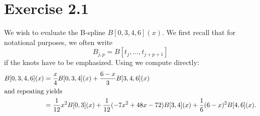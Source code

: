 \documentclass[12pt, article, oneside]{memoir}
\begin{document}
\chapter*{Exercise 2.1}
\label{sec:exercise_2_1}

We wish to evaluate the B-spline \(B[0, 3, 4, 6](x)\). We first recall that
for notational purposes, we often write
\begin{equation}
    B_{j, p} = B[t_j, \ldots, t_{j+p+1}]
\end{equation}
if the knots have to be emphasized. Using  we compute directly:
\begin{align*}
    B[0, 3, 4, 6](x) &= \frac{x}{4}B[0, 3, 4](x) + \frac{6-x}{3}B[3, 4, 6](x) \\
    \shortintertext{and repeating yields}
                      &= \frac{1}{12}x^2B[0, 3](x) + \frac{1}{12}(-7x^2 + 48x - 72)B[3, 4](x) + \frac{1}{6}(6-x)^2B[4, 6](x).
\end{align*}
\end{document}
